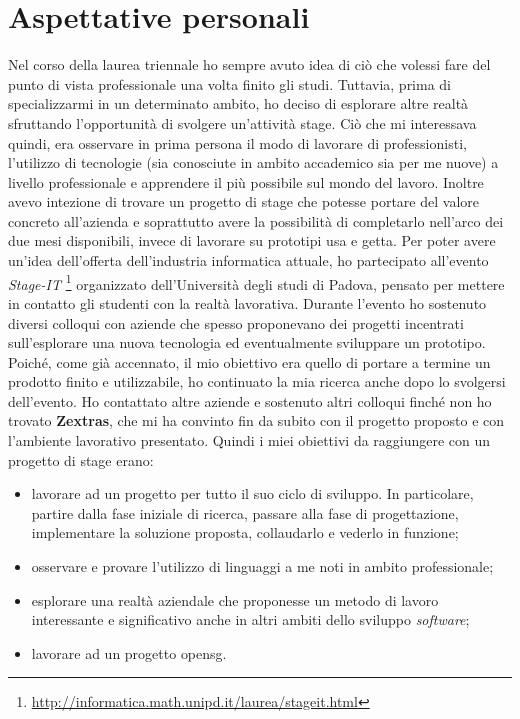 \section{Aspettative personali}
Nel corso della laurea triennale ho sempre avuto idea di ciò che volessi fare del punto di vista professionale una volta finito gli studi. Tuttavia, prima di specializzarmi in un determinato ambito, ho deciso di esplorare altre realtà sfruttando l'opportunità di svolgere un'attività stage. Ciò che mi interessava quindi, era osservare in prima persona il modo di lavorare di professionisti, l'utilizzo di tecnologie (sia conosciute in ambito accademico sia per me nuove) a livello professionale e apprendere il più possibile sul mondo del lavoro. Inoltre avevo intezione di trovare un progetto di stage che potesse portare del valore concreto all'azienda e soprattutto avere la possibilità di completarlo nell'arco dei due mesi disponibili, invece di lavorare su prototipi usa e getta.
Per poter avere un'idea dell'offerta dell'industria informatica attuale, ho partecipato all'evento \textit{Stage-IT} \footnote{\url{http://informatica.math.unipd.it/laurea/stageit.html}} organizzato dell'Università degli studi di Padova, pensato per mettere in contatto gli studenti con la realtà lavorativa. Durante l'evento ho sostenuto diversi colloqui con aziende che spesso proponevano dei progetti incentrati sull'esplorare una nuova tecnologia ed eventualmente sviluppare un prototipo. Poiché, come già accennato, il mio obiettivo era quello di portare a termine un prodotto finito e utilizzabile, ho continuato la mia ricerca anche dopo lo svolgersi dell'evento. Ho contattato altre aziende e sostenuto altri colloqui finché non ho trovato \textbf{Zextras}, che mi ha convinto fin da subito con il progetto proposto e con l'ambiente lavorativo presentato. Quindi i miei obiettivi da raggiungere con un progetto di stage erano:
\begin{itemize}
    \item lavorare ad un progetto per tutto il suo ciclo di sviluppo. In particolare, partire dalla fase iniziale di ricerca, passare alla fase di progettazione, implementare la soluzione proposta, collaudarlo e vederlo in funzione;
    \item osservare e provare l'utilizzo di linguaggi a me noti in ambito professionale;
    \item esplorare una realtà aziendale che proponesse un metodo di lavoro interessante e significativo anche in altri ambiti dello sviluppo \textit{software};
    \item lavorare ad un progetto \gls{opensg}.
\end{itemize}

